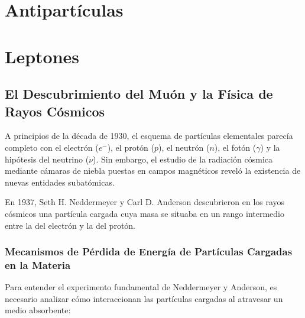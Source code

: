 \section{Antipartículas}

\newpage
\section{Leptones}


\subsection{El Descubrimiento del Muón y la Física de Rayos Cósmicos}

A principios de la década de 1930, el esquema de partículas elementales parecía completo con el electrón ($e^-$), el protón ($p$), el neutrón ($n$), el fotón ($\gamma$) y la hipótesis del neutrino ($\nu$). Sin embargo, el estudio de la radiación cósmica mediante cámaras de niebla puestas en campos magnéticos reveló la existencia de nuevas entidades subatómicas.

En 1937, Seth H. Neddermeyer y Carl D. Anderson descubrieron en los rayos cósmicos una partícula cargada cuya masa se situaba en un rango intermedio entre la del electrón y la del protón.

\subsubsection{Mecanismos de Pérdida de Energía de Partículas Cargadas en la Materia}

Para entender el experimento fundamental de Neddermeyer y Anderson, es necesario analizar cómo interaccionan las partículas cargadas al atravesar un medio absorbente:


